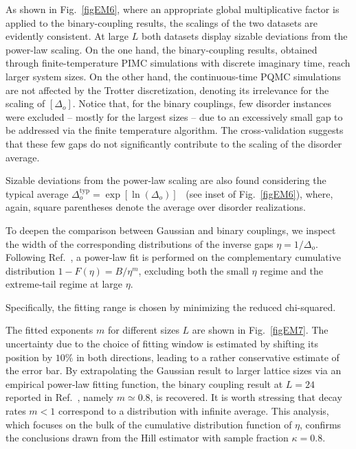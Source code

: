 \documentclass[aps,prl,twocolumn,superscriptaddress,nofootinbib]{revtex4-2}
\begin{document}
As shown in Fig.~\ref{figEM6}, where an appropriate global multiplicative factor is applied to the binary-coupling results, the scalings of the two datasets are evidently consistent. At large $L$ both datasets display sizable deviations from the power-law scaling. On the one hand, the binary-coupling results, obtained through finite-temperature PIMC simulations with discrete imaginary time, reach larger system sizes. On the other hand, the continuous-time PQMC simulations are not affected by the Trotter discretization, denoting its  irrelevance for the scaling of $[\Delta_o]$. Notice that, for the binary couplings, few disorder instances were excluded -- mostly for the largest sizes -- due to an excessively small gap to be addressed via the finite temperature algorithm. The cross-validation suggests that these few gaps do not  significantly  contribute to the scaling of the disorder average.

Sizable deviations from the power-law scaling are also found considering the typical average
$\Delta^{\mathrm{typ}}_o = \exp{\left[\ln(\Delta_o) \right]}$~\cite{PhysRevB.88.134204} (see inset of Fig.~\ref{figEM6}), where, again, square parentheses denote the average  over disorder realizations.


To deepen the comparison between Gaussian and binary couplings, we inspect the width of the corresponding distributions of the inverse gaps $\eta=1/\Delta_o$. Following Ref.~\cite{Bernaschi2024}, a power-law fit is performed on the complementary cumulative distribution $1-F(\eta)=B/\eta^{m}$, excluding both the small $\eta$ regime and the extreme-tail regime at large $\eta$.

Specifically, the fitting range is chosen by minimizing the reduced chi-squared.

The fitted exponents $m$ for different sizes $L$ are shown in Fig.~\ref{figEM7}. The uncertainty due to the choice of fitting window is estimated by shifting its position by $10\%$ in both directions, leading to a rather conservative estimate of the error bar. By extrapolating the Gaussian result to larger lattice sizes via an empirical power-law fitting function, the binary coupling result at $L=24$ reported in Ref.~\cite{Bernaschi2024}, namely $m\simeq 0.8$, is recovered. It is worth stressing that decay rates $m < 1$ correspond to a distribution with infinite average. This analysis, which focuses on the bulk of the cumulative distribution function of $\eta$, confirms the conclusions drawn from the Hill estimator with sample fraction $\kappa=0.8$.
\end{document}
